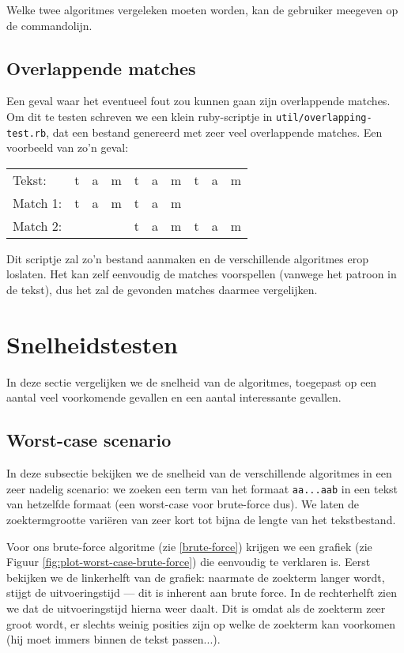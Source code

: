 \documentclass[a4paper,11pt]{article}
\begin{document}
Welke twee algoritmes vergeleken moeten worden, kan de gebruiker meegeven op de
commandolijn.

\subsection{Overlappende matches}

Een geval waar het eventueel fout zou kunnen gaan zijn overlappende matches. Om
dit te testen schreven we een klein ruby-scriptje in
\verb#util/overlapping-test.rb#, dat een bestand genereerd met zeer veel
overlappende matches. Een voorbeeld van zo'n geval:

\begin{center}
\begin{tabular}{llllllllll}
Tekst:   & t & a & m & t & a & m & t & a & m \\
Match 1: & t & a & m & t & a & m &   &   &   \\
Match 2: &   &   &   & t & a & m & t & a & m \\
\end{tabular}
\end{center}

Dit scriptje zal zo'n bestand aanmaken en de verschillende algoritmes erop
loslaten. Het kan zelf eenvoudig de matches voorspellen (vanwege het patroon in
de tekst), dus het zal de gevonden matches daarmee vergelijken.

\section{Snelheidstesten}

In deze sectie vergelijken we de snelheid van de algoritmes, toegepast op een
aantal veel voorkomende gevallen en een aantal interessante gevallen.

\subsection{Worst-case scenario}

In deze subsectie bekijken we de snelheid van de verschillende algoritmes in
een zeer nadelig scenario: we zoeken een term van het formaat \verb#aa...aab#
in een tekst van hetzelfde formaat (een worst-case voor brute-force dus). We
laten de zoektermgrootte vari\"eren van zeer kort tot bijna de lengte van het
tekstbestand.

Voor ons brute-force algoritme (zie \ref{brute-force}) krijgen we een grafiek
(zie Figuur \ref{fig:plot-worst-case-brute-force}) die eenvoudig te verklaren
is. Eerst bekijken we de linkerhelft van de grafiek: naarmate de zoekterm langer
wordt, stijgt de uitvoeringstijd — dit is inherent aan brute force. In de
rechterhelft zien we dat de uitvoeringstijd hierna weer daalt. Dit is omdat
als de zoekterm zeer groot wordt, er slechts weinig posities zijn op welke de
zoekterm kan voorkomen (hij moet immers binnen de tekst passen...).
\end{document}

